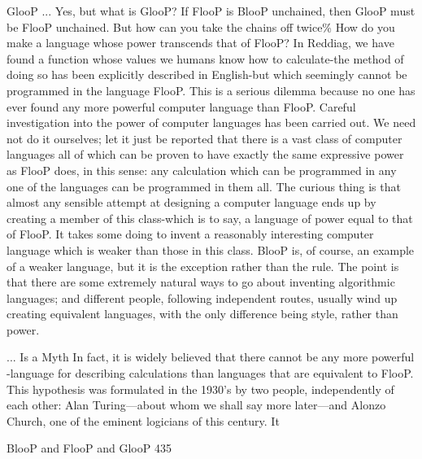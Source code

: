                                         GlooP ...
Yes, but what is GlooP? If FlooP is BlooP unchained, then GlooP must be FlooP
unchained. But how can you take the chains off twice\% How do you make a language
whose power transcends that of FlooP? In Reddiag, we have found a function whose
values we humans know how to calculate-the method of doing so has been explicitly
described in English-but which seemingly cannot be programmed in the language FlooP.
This is a serious dilemma because no one has ever found any more powerful computer
language than FlooP.
         Careful investigation into the power of computer languages has been carried out.
We need not do it ourselves; let it just be reported that there is a vast class of computer
languages all of which can be proven to have exactly the same expressive power as FlooP
does, in this sense: any calculation which can be programmed in any one of the languages
can be programmed in them all. The curious thing is that almost any sensible attempt at
designing a computer language ends up by creating a member of this class-which is to
say, a language of power equal to that of FlooP. It takes some doing to invent a
reasonably interesting computer language which is weaker than those in this class. BlooP
is, of course, an example of a weaker language, but it is the exception rather than the rule.
The point is that there are some extremely natural ways to go about inventing algorithmic
languages; and different people, following independent routes, usually wind up creating
equivalent languages, with the only difference being style, rather than power.

                                      ... Is a Myth
In fact, it is widely believed that there cannot be any more powerful -language for
describing calculations than languages that are equivalent to FlooP. This hypothesis was
formulated in the 1930's by two people, independently of each other: Alan Turing—about
whom we shall say more later—and Alonzo Church, one of the eminent logicians of this
century. It




BlooP and FlooP and GlooP                                                                435

